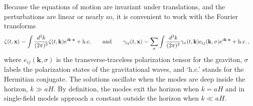 Because the equations of motion are invariant under translations, and the perturbations are linear or nearly so, it is convenient to work with the Fourier transforms
\begin{equation}
\zeta(t,\mathbf{x})=\int \frac{d^3 k}{(2\pi)^3}\zeta(t,\mathbf{k})e^{i \mathbf{k}\cdot\mathbf{x}}+{\rm h.c.}\qquad{\rm and}\qquad\gamma_{ij}(t,\mathbf{x})=\sum\limits_\sigma\int\frac{d^3k}{(2\pi)^3}\gamma_\sigma(t,\mathbf{k})e_{ij}(\mathbf{k},\sigma)e^{i \mathbf{k}\cdot\mathbf{x}}+{\rm h.c.}\,,
\end{equation}
where $e_{ij}(\mathbf{k},\sigma)$ is the transverse-traceless polarization tensor for the graviton, $\sigma$ labels the polarization states of the gravitational waves,
and `h.c.' stands for the Hermitian conjugate. The solutions oscillate when the modes are deep inside the horizon, $k\gg aH$. By definition, the modes exit the horizon when $k=aH$ and in single-field models approach a constant outside the horizon when $k\ll aH$.

